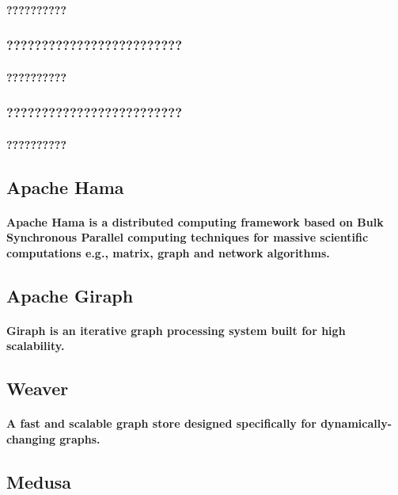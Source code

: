 \documentclass{acm_proc_article-sp}
\begin{document}
\paragraph{??????????}
\subsubsection{?????????????????????????}
\paragraph{??????????}
\subsubsection{?????????????????????????}
\paragraph{??????????}
\subsection{Apache Hama}
\paragraph{Apache Hama is a distributed computing framework based on Bulk Synchronous Parallel computing techniques for massive scientific computations e.g., matrix, graph and network algorithms.\cite{seo2010hama}}
\subsection{Apache Giraph}
\paragraph{Giraph is an iterative graph processing system built for high scalability.\cite{ching2013scaling}}
\subsection{Weaver}
\paragraph{A fast and scalable graph store designed specifically for dynamically-changing graphs.\cite{wu2012kernel}}
\subsection{Medusa}
\end{document}
